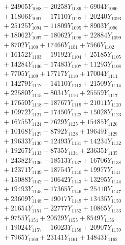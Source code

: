 \documentclass[a4paper,10pt]{article}
\begin{document}
{\begin{align}
&\;  + 24905 Y_{1088} + 20258 Y_{1089} + 6904 Y_{1090} \\[0.3ex]
&\;  + 11806 Y_{1091} + 17110 Y_{1092} + 20240 Y_{1093} \\[0.3ex]
&\;  + 25125 Y_{1094} + 11809 Y_{1095} + 8903 Y_{1096} \\[0.3ex]
&\;  + 18062 Y_{1097} + 18062 Y_{1098} + 22884 Y_{1099} \\[0.3ex]
&\;  + 8702 Y_{1100} + 17466 Y_{1101} + 7566 Y_{1102} \\[0.3ex]
&\;  + 16152 Y_{1103} + 19192 Y_{1104} + 25185 Y_{1105} \\[0.3ex]
&\;  + 14284 Y_{1106} + 17483 Y_{1107} + 11293 Y_{1108} \\[0.5ex]\allowbreak
&\;  + 7705 Y_{1109} + 17717 Y_{1110} + 17004 Y_{1111} \\[0.3ex]
&\;  + 14279 Y_{1112} + 14110 Y_{1113} + 21509 Y_{1114} \\[0.3ex]
&\;  + 22580 Y_{1115} + 8031 Y_{1116} + 25559 Y_{1117} \\[0.3ex]
&\;  + 17650 Y_{1118} + 18767 Y_{1119} + 21011 Y_{1120} \\[0.3ex]
&\;  + 10972 Y_{1121} + 17450 Y_{1122} + 15028 Y_{1123} \\[0.3ex]
&\;  + 16755 Y_{1124} + 7629 Y_{1125} + 15485 Y_{1126} \\[0.3ex]
&\;  + 10168 Y_{1127} + 8792 Y_{1128} + 19649 Y_{1129} \\[0.3ex]
&\;  + 19633 Y_{1130} + 12493 Y_{1131} + 14234 Y_{1132} \\[0.3ex]
&\;  + 19267 Y_{1133} + 8735 Y_{1134} + 23635 Y_{1135} \\[0.3ex]
&\;  + 24382 Y_{1136} + 18513 Y_{1137} + 16706 Y_{1138} \\[0.5ex]\allowbreak
&\;  + 12371 Y_{1139} + 18754 Y_{1140} + 19977 Y_{1141} \\[0.3ex]
&\;  + 15088 Y_{1142} + 10642 Y_{1143} + 13295 Y_{1144} \\[0.3ex]
&\;  + 19493 Y_{1145} + 17365 Y_{1146} + 25410 Y_{1147} \\[0.3ex]
&\;  + 23609 Y_{1148} + 19017 Y_{1149} + 13435 Y_{1150} \\[0.3ex]
&\;  + 21654 Y_{1151} + 22777 Y_{1152} + 10865 Y_{1153} \\[0.3ex]
&\;  + 9755 Y_{1154} + 20529 Y_{1155} + 8549 Y_{1156} \\[0.3ex]
&\;  + 19024 Y_{1157} + 16023 Y_{1158} + 20907 Y_{1159} \\[0.3ex]
&\;  + 7965 Y_{1160} + 23141 Y_{1161} + 14843 Y_{1162} \\[0.3ex]

\end{align}}
\end{document}
